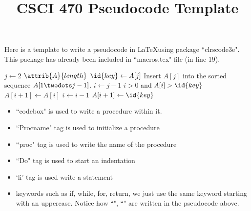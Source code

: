 \documentclass[12pt,twoside]{exam}
\title{CSCI 470 Pseudocode Template}
\newcommand{\theproblemsetnum}{01} %
\begin{document}

\setlength{\parindent}{0pt}
\medskip\hrulefill\medskip

Here is a template to write a pseudocode in \LaTeX using package ``clrscode3e". This package has already been included in ``macros.tex" file (in line 19). 


\begin{codebox}
        \li \For $j \gets 2$ \To $\attrib{A}{length}$
            \Do
            \li $\id{key} \gets A[j]$
            \li \Comment Insert $A[j]$ into the sorted sequence
            $A[1 \twodots j-1]$.
            \li $i \gets j-1$
            \li \While $i > 0$ and $A[i] > \id{key}$
                \Do
                \li $A[i+1] \gets A[i]$
                \li $i \gets i-1$
                \End
            \li $A[i+1] \gets \id{key}$
            \End
\end{codebox}

\begin{itemize}
    \item ``codebox" is used to write a procedure within it. 
    \item ``Procname" tag is used to initialize a procedure
    \item ``proc" tag is used to write the name of the procedure 
    \item ``Do" tag is used to start an indentation 
    \item `li' tag is used write a statement 
    \item keywords such as if, while, for, return, we just use the same keyword starting with an uppercase. Notice how ``\While", ``\For" are written in the pseudocode above. 
\end{itemize}
\end{document}
